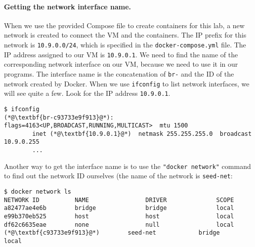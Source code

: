
\paragraph{Getting the network interface name.}
When we use the provided Compose file to create
containers for this lab, a new network is created
to connect the VM and the containers. The
IP prefix for this network is \texttt{10.9.0.0/24},
which is specified in the \texttt{docker-compose.yml}
file. The IP address assigned to our VM is
\texttt{10.9.0.1}. We need to find the name of
the corresponding network interface on our VM, because we
need to use it in our programs.
The interface name is the concatenation of \texttt{br-}
and the ID of the network created by Docker.
When we use \texttt{ifconfig} to list network interfaces,
we will see quite a few. Look for the IP address
\texttt{10.9.0.1}.


\begin{lstlisting}
$ ifconfig
(*@\textbf{br-c93733e9f913}@*): flags=4163<UP,BROADCAST,RUNNING,MULTICAST>  mtu 1500
        inet (*@\textbf{10.9.0.1}@*)  netmask 255.255.255.0  broadcast 10.9.0.255
        ...
\end{lstlisting}


Another way to get the interface name is to use the \texttt{"docker network"} command to
find out the network ID ourselves (the name of the network is \texttt{seed-net}:

\begin{lstlisting}
$ docker network ls
NETWORK ID          NAME                DRIVER              SCOPE
a82477ae4e6b        bridge              bridge              local
e99b370eb525        host                host                local
df62c6635eae        none                null                local
(*@\textbf{c93733e9f913}@*)        seed-net            bridge              local
\end{lstlisting}


